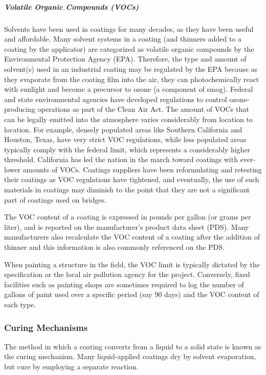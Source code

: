 \subparagraph*{Volatile Organic Compounds (VOCs)}
Solvents have been used in coatings for many decades, as they have been useful and affordable. Many solvent
systems in a coating (and thinners added to a coating by the applicator) are categorized as volatile organic
compounds by the Environmental Protection Agency (EPA). Therefore, the type and amount of solvent(s) used in an
industrial coating may be regulated by the EPA because as they evaporate from the coating film into the air, they can
photochemically react with sunlight and become a precursor to ozone (a component of smog). Federal and state
environmental agencies have developed regulations to control ozone-producing operations as part of the Clean Air
Act. The amount of VOCs that can be legally emitted into the atmosphere varies considerably from location to
location. For example, densely populated areas like Southern California and Houston, Texas, have very strict VOC
regulations, while less populated areas typically comply with the federal limit, which represents a considerably
higher threshold. California has led the nation in the march toward coatings with ever-lower amounts of VOCs.
Coatings suppliers have been reformulating and retesting their coatings as VOC regulations have tightened, and
eventually, the use of such materials in coatings may diminish to the point that they are not a significant part of
coatings used on bridges.

The VOC content of a coating is expressed in pounds per gallon (or grams per liter), and is reported on the
manufacturer’s product data sheet (PDS). Many manufacturers also recalculate the VOC content of a coating after the
addition of thinner and this information is also commonly referenced on the PDS.

When painting a structure in the field, the VOC limit is typically dictated by the specification or the local air
pollution agency for the project. Conversely, fixed facilities such as painting shops are sometimes required to log the
number of gallons of paint used over a specific period (say 90 days) and the VOC content of each type.

\subsubsection{Curing Mechanisms}
The method in which a coating converts from a liquid to a solid state is known as the curing mechanism. Many
liquid-applied coatings dry by solvent evaporation, but cure by employing a separate reaction.

